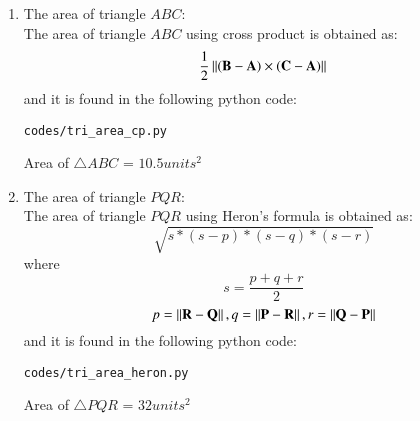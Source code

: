 \begin{enumerate}[label=\thesection.\arabic*.,ref=\thesection.\theenumi]
\item The area of triangle $ABC$: \\
\solution The area of triangle $ABC$ using cross product is obtained as:
$$\frac{1}{2}\left\lVert(\mathbf{B}-\mathbf{A})\times(\mathbf{C}-\mathbf{A})\right\rVert$$
and it is found in the following python code:
\begin{lstlisting}
codes/tri_area_cp.py
\end{lstlisting} 

Area of $\triangle{ABC}$ = $10.5 units^2$

\item The area of triangle $PQR$: \\
\solution The area of triangle $PQR$ using Heron's formula is obtained as:
$$\sqrt{s*(s-p)*(s-q)*(s-r)}$$
where $$ s =\frac{p+q+r}{2}$$
$$ p = \left\lVert\mathbf{R}-\mathbf{Q}\right\rVert, q = \left\lVert\mathbf{P}-\mathbf{R}\right\rVert, r = \left\lVert\mathbf{Q}-\mathbf{P}\right\rVert$$
and it is found in the following python code:
\begin{lstlisting}
codes/tri_area_heron.py
\end{lstlisting} 

Area of $\triangle{PQR}$ = $32 units^2$

\end{enumerate}